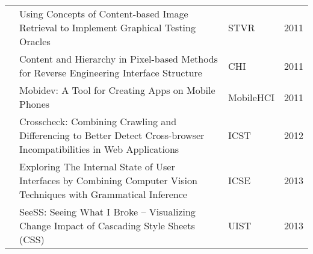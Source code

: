 \begin{sidewaystable}
\begin{tabular}{@{} lp{12.9cm}ll @{}}
\citet{Delamaro-2011-STVR}   & Using Concepts of Content‐based Image Retrieval to Implement Graphical Testing Oracles                                              & STVR           & 2011          \\
\citet{Dixon-2011-CHI}       & Content and Hierarchy in Pixel-based Methods for Reverse Engineering Interface Structure                                            & CHI            & 2011          \\
\citet{Seifert-2011-MobileHCI} & Mobidev: A Tool for Creating Apps on Mobile Phones                                                                                & MobileHCI      & 2011          \\
\citet{Choudhary-2012-ICST}  & Crosscheck: Combining Crawling and Differencing to Better Detect Cross-browser Incompatibilities in Web Applications                & ICST           & 2012          \\

\citet{Givens-2013-ICSE}     & Exploring The Internal State of User Interfaces by Combining Computer Vision Techniques with Grammatical Inference                  & ICSE           & 2013          \\

\citet{Liang-2013-UIST}      & SeeSS: Seeing What I Broke -- Visualizing Change Impact of Cascading Style Sheets (CSS)                                             & UIST           & 2013          \\



\end{tabular}
\end{sidewaystable}
